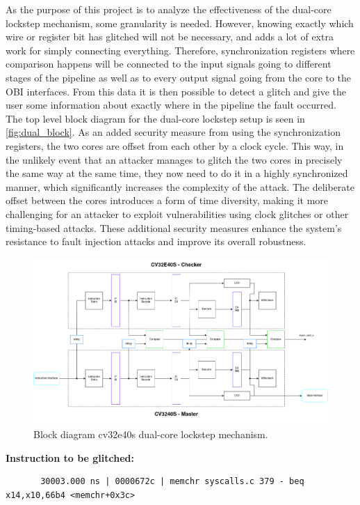 As the purpose of this project is to analyze the effectiveness of the dual-core lockstep mechanism, some granularity is needed. However, knowing exactly which wire or register bit has glitched will not be necessary, and adds a lot of extra work for simply connecting everything. Therefore, synchronization registers where comparison happens will be connected to the input signals going to different stages of the pipeline as well as to every output signal going from the core to the OBI interfaces. From this data it is then possible to detect a glitch and give the user some information about exactly where in the pipeline the fault occurred. The top level block diagram for the dual-core lockstep setup is seen in \autoref{fig:dual_block}. 
As an added security measure from using the synchronization registers, the two cores are offset from each other by a clock cycle. This way, in the unlikely event that an attacker manages to glitch the two cores in precisely the same way at the same time, they now need to do it in a highly synchronized manner, which significantly increases the complexity of the attack. The deliberate offset between the cores introduces a form of time diversity, making it more challenging for an attacker to exploit vulnerabilities using clock glitches or other timing-based attacks. These additional security measures enhance the system's resistance to fault injection attacks and improve its overall robustness.

\begin{figure}[h!]
    \centering
    \includegraphics[width=\textwidth]{docs/images/dual_cores_block.png}
    \caption{Block diagram cv32e40s dual-core lockstep mechanism.}
    \label{fig:dual_block}
\end{figure}

\textbf{Instruction to be glitched:}
\begin{lstlisting}
       30003.000 ns | 0000672c | memchr syscalls.c 379 - beq x14,x10,66b4 <memchr+0x3c>
\end{lstlisting}

